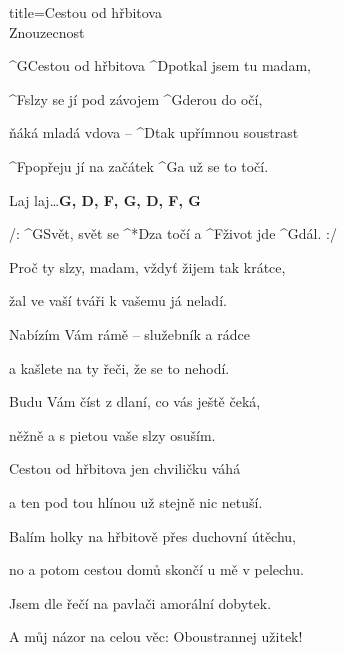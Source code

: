 \begin{song}{title=\predtitle\centering Cestou od hřbitova \\\large Znouzecnost  \vspace*{-0.3cm}}  %
\begin{centerjustified}
\nejnejvetsi

\sloka
	^{G\z }Cestou od hřbitova ^{D\z }potkal jsem tu madam,

	^{F}slzy se jí pod závojem ^{G\z }derou do očí,

	ňáká mladá vdova -- ^{D}tak upřímnou soustrast

	^{F\z }popřeju jí na začátek ^{G}a už se to točí.

	Laj laj\elipsa\dots \textbf{G, D, F, G, D, F, G}

	/: ^{G\z }Svět, svět se ^*{D}za točí a ^{F\z }život jde ^{G}dál. :/ %

\sloka
	Proč ty slzy, madam, vždyť žijem tak krátce,

	žal ve vaší tváři k vašemu já neladí.

	Nabízím Vám rámě -- služebník a rádce

	a kašlete na ty řeči, že se to nehodí.


\sloka
	Budu Vám číst z dlaní, co vás ještě čeká,

	něžně a s pietou vaše slzy osuším.

	Cestou od hřbitova jen chviličku váhá

	a ten pod tou hlínou už stejně nic netuší.


\sloka
	Balím holky na hřbitově přes duchovní útěchu,

	no a potom cestou domů skončí u mě v pelechu.

	Jsem dle řečí na pavlači amorální dobytek.

	A můj názor na celou věc: Oboustrannej užitek!


\end{centerjustified}
\setcounter{Slokočet}{0}
\end{song}
